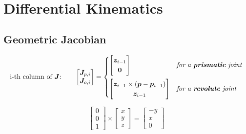 \section{Differential Kinematics}

\subsection{Geometric Jacobian}
\vspace*{5pt}
\begin{align*}
	\text{i-th column of } \bm{J} \text{:} \qquad
	\begin{bmatrix}
		\bm{J}_{p,i} \\
		\bm{J}_{o,i}
	\end{bmatrix}
	=
	\begin{cases}
		\begin{bmatrix}
			\bm{z}_{i-1} \\
			\bm{0}
		\end{bmatrix}
		& \textit{for a \textbf{prismatic} joint}
		\vspace*{5pt}
		\\
		\begin{bmatrix}
			\bm{z}_{i-1} \times (\bm{p} - \bm{p}_{i-1}) \\
			\bm{z}_{i-1} 
		\end{bmatrix}
		& \textit{for a \textbf{revolute} joint}
	\end{cases}
\end{align*}

\vspace*{5pt}

\vspace*{8pt}
$$
\begin{bmatrix}0 \\ 0 \\ 1\end{bmatrix}
\times
\begin{bmatrix}x \\ y \\ z\end{bmatrix}
=
\begin{bmatrix}-y \\ x \\ 0\end{bmatrix}
$$


